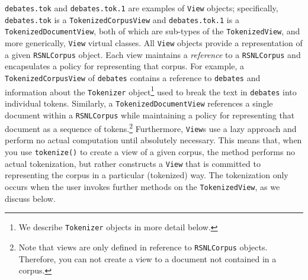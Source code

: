 \documentclass[11pt]{article}
\let\code=\texttt
\let\rclass=\texttt
\begin{document}
\code{debates.tok} and \code{debates.tok.1} are examples of
\rclass{View} objects; specifically, \code{debates.tok} is a
\rclass{TokenizedCorpusView} and \code{debates.tok.1} is a
\rclass{TokenizedDocumentView}, both of which are sub-types of the
\code{TokenizedView}, and more generically, \rclass{View} virtual
classes.  All \rclass{View} objects provide a representation of a
given \rclass{RSNLCorpus} object.  Each view maintains a \emph{reference}
to a \rclass{RSNLCorpus} and encapsulates a policy for representing that
corpus.  For example, a \rclass{TokenizedCorpusView} of \code{debates}
contains a reference to \code{debates} and information about the
\rclass{Tokenizer} object\footnote{We describe \rclass{Tokenizer}
objects in more detail below.} used to break the text in
\code{debates} into individual tokens.  Similarly, a
\rclass{TokenizedDocumentView} references a single document within a
\rclass{RSNLCorpus} while maintaining a policy for representing that
document as a sequence of tokens.\footnote{Note that views are only
defined in reference to \rclass{RSNLCorpus} objects.  Therefore, you can
not create a view to a document not contained in a corpus.}
Furthermore, \rclass{View}s use a lazy approach and perform no actual
computation until absolutely necessary.  This means that, when
you use \code{tokenize()} to create a view of a given corpus, the
method performs no actual tokenization, but rather constructs a
\rclass{View} that is committed to representing the corpus in a
particular (tokenized) way.  The tokenization only occurs when the
user invokes further methods on the \rclass{TokenizedView}, as we
discuss below.  
\end{document}
